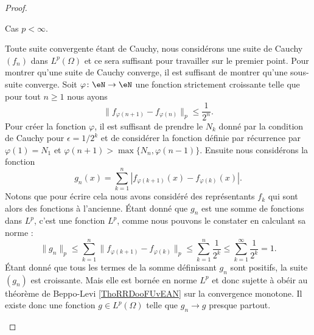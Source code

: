 \begin{proof}
\begin{subproof}
\item[Cas \( p<\infty\).]

        Toute suite convergente étant de Cauchy, nous considérons une suite de Cauchy \( (f_n)\) dans \( L^p(\Omega)\) et ce sera suffisant pour travailler sur le premier point. Pour montrer qu'une suite de Cauchy converge, il est suffisant de montrer qu'une sous-suite converge. Soit \( \varphi\colon \eN\to \eN\) une fonction strictement croissante telle que pour tout \( n\geq 1\) nous ayons
        \begin{equation}
            \| f_{\varphi(n+1)}-f_{\varphi(n)} \|_p\leq \frac{1}{ 2^{n} }.
        \end{equation}
        Pour créer la fonction \( \varphi\), il est suffisant de prendre le \( N_k\) donné par la condition de Cauchy pour \( \epsilon=1/2^k\) et de considérer la fonction définie par récurrence par \( \varphi(1)=N_1\) et \( \varphi(n+1)>\max\{ N_n,\varphi(n-1) \}\). Ensuite nous considérons la fonction
        \begin{equation}
            g_n(x)=\sum_{k=1}^n| f_{\varphi(k+1)}(x)-f_{\varphi(k)}(x) |.
        \end{equation}
        Notons que pour écrire cela nous avons considéré des représentants \( f_k\) qui sont alors des fonctions à l'ancienne. Étant donné que \( g_n\) est une somme de fonctions dans \( L^p\), c'est une fonction \( L^p\), comme nous pouvons le constater en calculant sa norme :
        \begin{equation}
            \| g_n \|_p\leq \sum_{k=1}^n\| f_{\varphi(k+1)}-f_{\varphi(k)} \|_p\leq\sum_{k=1}^n\frac{1}{ 2^k }\leq\sum_{k=1}^{\infty}\frac{1}{ 2^k }=1.
        \end{equation}
        Étant donné que tous les termes de la somme définissant \( g_n\) sont positifs, la suite \( (g_n)\) est croissante. Mais elle est bornée en norme \( L^p\) et donc sujette à obéir au théorème de Beppo-Levi \ref{ThoRRDooFUvEAN} sur la convergence monotone. Il existe donc une fonction \( g\in L^p(\Omega)\) telle que \( g_n\to g\) presque partout.


\end{subproof}
\end{proof}
